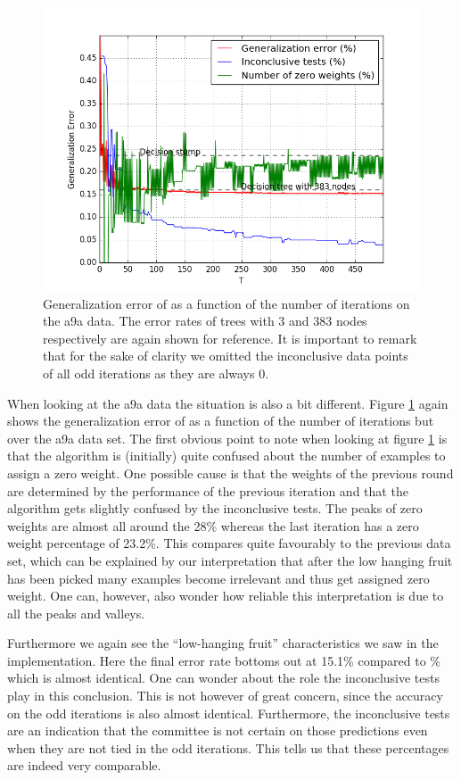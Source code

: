 \begin{figure}[!ht]
  \centering
      \includegraphics[width=\graphWidth]{generated/NHSVM.png}
  \caption{Generalization error of \NHB as a function of the number of iterations on the a9a data. The error rates of trees with 3 and 383 nodes respectively are again shown for reference. It is important to remark that for the sake of clarity we omitted the inconclusive data points of all odd iterations as they are always 0.}
      \label{fig:NHBSVM}
\end{figure}

\par When looking at the a9a data the situation is also a bit different. Figure \ref{fig:NHBSVM} again shows the generalization error of \NHB as a function of the number of iterations but over the a9a data set. The first obvious point to note when looking at figure \ref{fig:NHBSVM} is that the algorithm is (initially) quite confused about the number of examples to assign a zero weight. One possible cause is that the weights of the previous round are determined by the performance of the previous iteration and that the algorithm gets slightly confused by the inconclusive tests. The peaks of zero weights are almost all around the 28\% whereas the last iteration has a zero weight percentage of 23.2\%. This compares quite favourably to the previous data set, which can be explained by our interpretation that after the low hanging fruit has been picked many examples become irrelevant and thus get assigned zero weight. One can, however, also wonder how reliable this interpretation is due to all the peaks and valleys. 
\par Furthermore we again see the ``low-hanging fruit'' characteristics we saw in the \adaB implementation. Here the final error rate bottoms out at 15.1\% compared to \% which is almost identical. One can wonder about the role the inconclusive tests play in this conclusion. This is not however of great concern, since the accuracy on the odd iterations is also almost identical. Furthermore, the inconclusive tests are an indication that the committee is not certain on those predictions even when they are not tied in the odd iterations. This tells us that these percentages are indeed very comparable.  
\FloatBarrier
